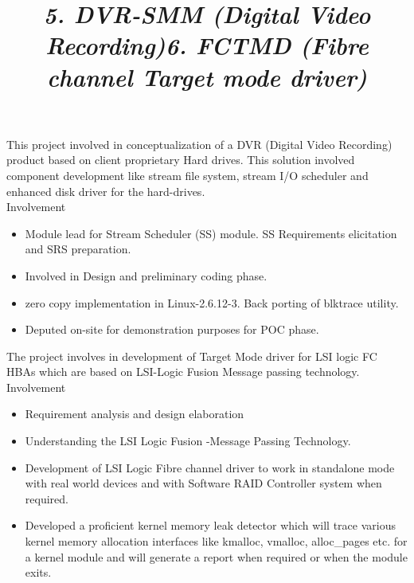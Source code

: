\begin{resume}
\title{\em 5. DVR-SMM (Digital Video Recording)}

\begin {position}
This project involved in conceptualization of a DVR (Digital Video Recording) product based on client proprietary Hard drives. This solution involved component development like stream file system, stream I/O scheduler and enhanced disk driver for the hard-drives. \\

Involvement
\begin{itemize}
\item Module lead for Stream Scheduler (SS) module. SS Requirements elicitation and SRS preparation.
\item Involved in Design and preliminary coding phase.
\item zero copy implementation in Linux-2.6.12-3. Back porting of blktrace utility.
\item Deputed on-site for demonstration purposes for POC phase.
\end{itemize}
\end{position}
\hrulefill

\title{\em 6. FCTMD (Fibre channel Target mode driver)}

\begin {position}
The project involves in development of Target Mode driver for LSI logic FC HBAs which are based on LSI-Logic Fusion Message passing technology. \\

Involvement
\begin{itemize}
\item Requirement analysis and design elaboration
\item Understanding the LSI Logic Fusion -Message Passing Technology.
\item Development of LSI Logic Fibre channel driver to work in standalone mode with real world devices and with Software RAID Controller system when required.
\item Developed a proficient kernel memory leak detector which will trace various kernel memory allocation interfaces like kmalloc, vmalloc, alloc\_pages etc. for a kernel module and will generate a report when required or when the module exits. 

\end{itemize}
\end{position}
\hrulefill


\end{resume}
